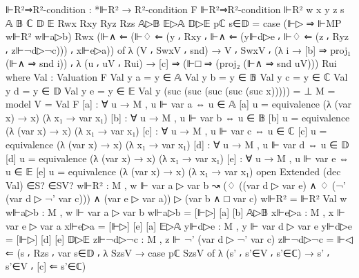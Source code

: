 \begin{spverbatim}
  ⊩R²⇒R²-condition : *⊩R² → R²-condition F
  ⊩R²⇒R²-condition ⊩R² {w} {x} {y} {z} {s} {𝔸} {𝔹} {ℂ} {𝔻} {𝔼}
    Rwx Rxy Ryz Rzs 𝔸▷𝔹 𝔼▷𝔸 𝔻▷𝔼 pℂ s∈𝔻
      = case (⊩▷ ⇒ ⊩MP w⊩R² w⊩a▷b) Rwx (⊩∧ ⇐ (⊩♢ ⇐ (y ⸴ Rxy ⸴ ⊩∧ ⇐
      (y⊩d▷e ⸴ ⊩♢ ⇐ (z ⸴ Ryz ⸴ z⊩¬d▷¬c))) ⸴ x⊩e▷a)) of
      λ { (V ⸴ SwxV ⸴ snd) → V ⸴ SwxV ⸴ (λ {i → [b] ⇒ proj₁ (⊩∧ ⇒ snd i)}) ⸴
      λ { (u ⸴ uV ⸴ Rui) → [c] ⇒ (⊩□ ⇒ (proj₂ (⊩∧ ⇒ snd uV))) Rui}}
    where
    Val : Valuation F
    Val y a = y ∈ 𝔸
    Val y b = y ∈ 𝔹
    Val y c = y ∈ ℂ
    Val y d = y ∈ 𝔻
    Val y e = y ∈ 𝔼
    Val y (suc (suc (suc (suc (suc x))))) = ⊥
    M = model {V = Val} F
    [a] : ∀ {u} → M , u ⊩ var a ⇔ u ∈ 𝔸
    [a] {u} = equivalence (λ { (var x) → x}) (λ x₁ → var x₁)
    [b] : ∀ {u} → M , u ⊩ var b ⇔ u ∈ 𝔹
    [b] {u} = equivalence (λ { (var x) → x}) (λ x₁ → var x₁)
    [c] : ∀ {u} → M , u ⊩ var c ⇔ u ∈ ℂ
    [c] {u} = equivalence (λ { (var x) → x}) (λ x₁ → var x₁)
    [d] : ∀ {u} → M , u ⊩ var d ⇔ u ∈ 𝔻
    [d] {u} = equivalence (λ { (var x) → x}) (λ x₁ → var x₁)
    [e] : ∀ {u} → M , u ⊩ var e ⇔ u ∈ 𝔼
    [e] {u} = equivalence (λ { (var x) → x}) (λ x₁ → var x₁)
    open Extended (dec Val) ∈S? ∈SV?
    w⊩R² : M , w ⊩ var a ▷ var b ↝ (♢ ((var d ▷ var e) ∧ ♢ (¬' (var d ▷ ¬' var c))) ∧
      (var e ▷ var a)) ▷ (var b ∧ □ var c)
    w⊩R² = ⊩R² Val w
    w⊩a▷b : M , w ⊩ var a ▷ var b
    w⊩a▷b = [⊩▷] [a] [b] 𝔸▷𝔹
    x⊩e▷a : M , x ⊩ var e ▷ var a
    x⊩e▷a = [⊩▷] [e] [a] 𝔼▷𝔸
    y⊩d▷e : M , y ⊩ var d ▷ var e
    y⊩d▷e = [⊩▷] [d] [e] 𝔻▷𝔼
    z⊩¬d▷¬c : M , z ⊩ ¬' (var d ▷ ¬' var c)
    z⊩¬d▷¬c = ⊩◁ ⇐ (s ⸴ Rzs ⸴ var s∈𝔻 ⸴ λ {SzsV → case pℂ SzsV of
      λ { (s' ⸴ s'∈V ⸴ s'∈ℂ) → s' ⸴ s'∈V ⸴ [c] ⇐ s'∈ℂ}})
\end{spverbatim}
